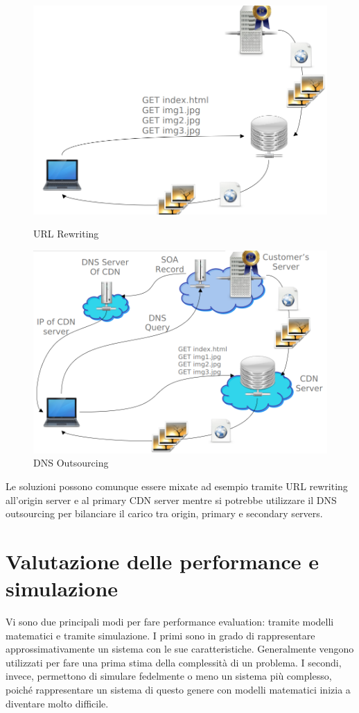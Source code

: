 \documentclass{article}
\begin{document}
		
		\begin{figure}[ht]
			\centering
			\begin{minipage}{0.5\textwidth}
				\centering
				\includegraphics[width=0.9\linewidth]{images/SAC_A5_urlrewriting}
				\caption{URL Rewriting}
			\end{minipage}\hfill
			\begin{minipage}{0.5\textwidth}
				\centering
				\includegraphics[width=0.9\linewidth]{images/SAC_A5_dnsoutsourcing}
				\caption{DNS Outsourcing}
			\end{minipage}
		\end{figure}

		
		Le soluzioni possono comunque essere mixate ad esempio tramite URL rewriting all'origin server e al primary CDN server mentre si potrebbe utilizzare il DNS outsourcing per bilanciare il carico tra origin, primary e secondary servers. 
		\newpage
		
		\section{Valutazione delle performance e simulazione}
		Vi sono due principali modi per fare performance evaluation: tramite modelli matematici e tramite
		simulazione.
		I primi sono in grado di rappresentare approssimativamente un sistema con le sue caratteristiche.
		Generalmente vengono utilizzati per fare una prima stima della complessità di un problema.
		I secondi, invece, permettono di simulare fedelmente o meno un sistema più complesso, poiché
		rappresentare un sistema di questo genere con modelli matematici inizia a diventare molto difficile.
		
\end{document}
